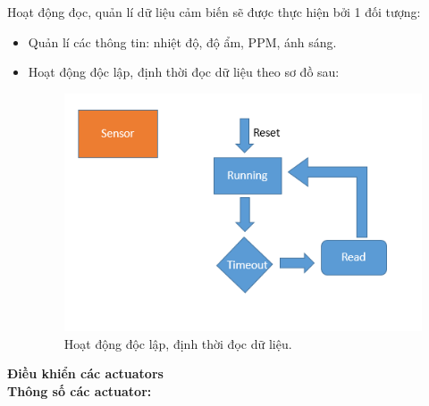 \documentclass[a4paper,12pt,oneside]{article}
\begin{document}
\noindent Hoạt động đọc, quản lí dữ liệu cảm biến sẽ được thực hiện bởi 1 đối tượng:
\begin{itemize}
\item Quản lí các thông tin: nhiệt độ, độ ẩm, PPM, ánh sáng.
\item Hoạt động độc lập, định thời đọc dữ liệu theo sơ đồ sau:
\begin{center}
\begin{figure}[h!]
\begin{center}
\includegraphics[scale=1]{hinh/sensor.PNG}
\end{center}
\caption{Hoạt động độc lập, định thời đọc dữ liệu.}
\end{figure}
\end{center}
\end{itemize}

\noindent \textbf{Điều khiển các actuators}\\
\noindent \textbf{Thông số các actuator:}
\end{document}
